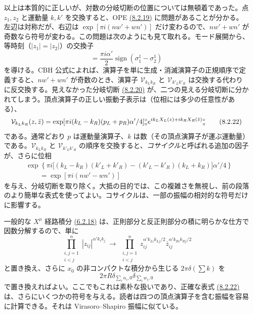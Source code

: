 
以上は本質的に正しいが、対数の分岐切断の位置については無頓着であった。点 $z_1,z_2$ と運動量 $k,k'$ を交換すると、OPE \hyperref[eq:8.2.19]{(8.2.19)} に問題があることが分かる。左辺は対称だが、右辺は $\exp[\pi i(nw'+wn')]$ だけ変わるので、$nw'+wn'$ が奇数なら符号が変わる。この問題は次のようにも見て取れる。モード展開から、等時刻（$|z_1|=|z_2|$）の交換子
\begin{equation}
[X_L(z_1),X_L(z_2)]=\frac{\pi i\alpha'}2\operatorname{sign}(\sigma_1^1-\sigma_2^1)
\tag{8.2.21}\label{eq:8.2.21}
\end{equation}
を導ける。CBH 公式によれば、演算子を単に生成・消滅演算子の正規順序で定義すると、$nw'+wn'$ が奇数のとき、演算子 $\mathcal V_{k_Lk_R}$ と $\mathcal V_{k'_Lk'_R}$ は交換する代わりに反交換する。見えなかった分岐切断 \hyperref[eq:8.2.20]{(8.2.20)} が、二つの見える分岐切断に分かれてしまう。頂点演算子の正しい振動子表示は（位相には多少の任意性がある）、
\begin{equation}
\mathcal V_{k_Lk_R}(z,\bar z)
=\exp[\pi i(k_L-k_R)(p_L+p_R)\alpha'/4]
\mathopen{{}^{\circ}_{\circ}}e^{ik_LX_L(z)+ik_RX_R(\bar z)}\mathclose{{}^{\circ}_{\circ}}
\tag{8.2.22}\label{eq:8.2.22}
\end{equation}
である。通常どおり $p$ は運動量演算子、$k$ は数（その頂点演算子が運ぶ運動量）である。$\mathcal V_{k_Lk_R}$ と $\mathcal V_{k'_Lk'_R}$ の順序を交換すると、\emph{コサイクル}と呼ばれる追加の因子が、さらに位相
\begin{equation}
\begin{aligned}
&\exp\left\{\pi i\bigl[(k_L-k_R)(k'_L+k'_R)
-(k'_L-k'_R)(k_L+k_R)\bigr]\alpha'/4\right\}\\
&\qquad=\exp[\pi i(nw'-wn')]
\end{aligned}
\tag{8.2.23}\label{eq:8.2.23}
\end{equation}
を与え、分岐切断を取り除く。大抵の目的では、この複雑さを無視し、前の段落のより簡単な表式を使ってよい。コサイクルは、一部の振幅の相対的な符号だけに影響する。

一般的な $X^\mu$ 経路積分 \hyperref[eq:6.2.18]{(6.2.18)} は、正則部分と反正則部分の積に明らかな仕方で因数分解するので、単に
\begin{equation}
\prod_{\substack{i,j=1\\i<j}}^n|z_{ij}|^{\alpha'k_ik_j}
\ \longrightarrow\
\prod_{\substack{i,j=1\\i<j}}^n
z_{ij}^{\alpha'k_{Li}k_{Lj}/2}\bar z_{ij}^{\alpha'k_{Ri}k_{Rj}/2}
\tag{8.2.24}\label{eq:8.2.24}
\end{equation}
と置き換え、さらに $x_0$ の非コンパクトな積分から生じる $2\pi\delta(\sum k)$ を
\begin{equation}
2\pi R\delta_{\sum_i n_i,0}\delta_{\sum_i w_i,0}
\tag{8.2.25}\label{eq:8.2.25}
\end{equation}
で置き換えればよい。ここでもこれは素朴な扱いであり、正確な表式 \hyperref[eq:8.2.22]{(8.2.22)} は、さらにいくつかの符号を与える。読者は四つの頂点演算子を含む振幅を容易に計算できる。それは Virasoro--Shapiro 振幅に似ている。

